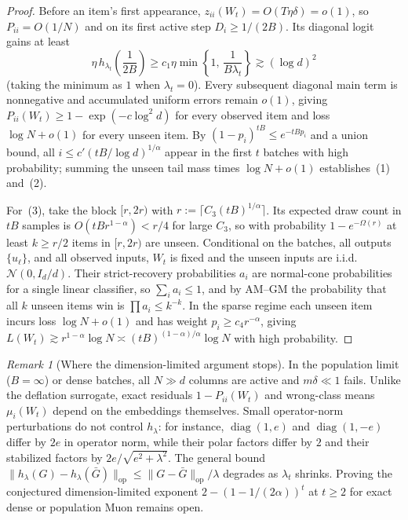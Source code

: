 \documentclass[11pt]{article}
\theoremstyle{plain}
\theoremstyle{definition}
\theoremstyle{remark}
\newtheorem{remark}{Remark}
\DeclareMathOperator{\diag}{diag}
\begin{document}
\begin{proof}
Before an item's first appearance, $z_{ii}(W_t) = O(T\eta\delta) = o(1)$, so $P_{ii} = O(1/N)$ and on its first active step $D_i \ge 1/(2B)$.
Its diagonal logit gains at least
\[
\eta\, h_{\lambda_t}\!\left(\frac{1}{2B}\right) \ge c_1 \eta \min\!\left\{1,\, \frac{1}{B\lambda_t}\right\} \gtrsim (\log d)^2
\]
(taking the minimum as $1$ when $\lambda_t = 0$).
Every subsequent diagonal main term is nonnegative and accumulated uniform errors remain $o(1)$, giving $P_{ii}(W_t) \ge 1 - \exp(-c\log^2 d)$ for every observed item and loss $\log N + o(1)$ for every unseen item.
By $(1 - p_i)^{tB} \le e^{-tB p_i}$ and a union bound, all $i \le c'(tB/\log d)^{1/\alpha}$ appear in the first $t$ batches with high probability; summing the unseen tail mass times $\log N + o(1)$ establishes~(1) and~(2).

For~(3), take the block $[r, 2r)$ with $r := \lceil C_3(tB)^{1/\alpha}\rceil$.
Its expected draw count in $tB$ samples is $O(tB r^{1-\alpha}) < r/4$ for large $C_3$, so with probability $1 - e^{-\Omega(r)}$ at least $k \ge r/2$ items in $[r, 2r)$ are unseen.
Conditional on the batches, all outputs $\{u_\ell\}$, and all observed inputs, $W_t$ is fixed and the unseen inputs are i.i.d.\ $\mathcal{N}(0, I_d/d)$.
Their strict-recovery probabilities $a_i$ are normal-cone probabilities for a single linear classifier, so $\sum_i a_i \le 1$, and by AM--GM the probability that all $k$ unseen items win is $\prod a_i \le k^{-k}$.
In the sparse regime each unseen item incurs loss $\log N + o(1)$ and has weight $p_i \ge c_4 r^{-\alpha}$, giving $L(W_t) \gtrsim r^{1-\alpha}\log N \asymp (tB)^{(1-\alpha)/\alpha}\log N$ with high probability.
\end{proof}

\begin{remark}[Where the dimension-limited argument stops]
In the population limit ($B = \infty$) or dense batches, all $N \gg d$ columns are active and $m\delta \ll 1$ fails.
Unlike the deflation surrogate, exact residuals $1 - P_{ii}(W_t)$ and wrong-class means $\mu_i(W_t)$ depend on the embeddings themselves.
Small operator-norm perturbations do not control $h_\lambda$: for instance, $\diag(1, e)$ and $\diag(1, -e)$ differ by $2e$ in operator norm, while their polar factors differ by $2$ and their stabilized factors by $2e/\sqrt{e^2+\lambda^2}$.
The general bound $\|h_\lambda(G) - h_\lambda(\bar G)\|_{\mathrm{op}} \le \|G - \bar G\|_{\mathrm{op}}/\lambda$ degrades as $\lambda_t$ shrinks.
Proving the conjectured dimension-limited exponent $2 - (1 - 1/(2\alpha))^t$ at $t \ge 2$ for exact dense or population Muon remains open.
\end{remark}
\end{document}

